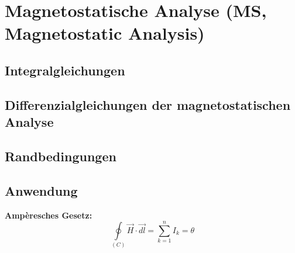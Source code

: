 \section{Magnetostatische Analyse (MS, Magnetostatic Analysis)}
\subsection{Integralgleichungen}
\subsection{Differenzialgleichungen der magnetostatischen Analyse}
\subsection{Randbedingungen}
\subsection{Anwendung}
\textbf{Ampèresches Gesetz:} \\
\[ \oint\limits_{(C)}\vec{H}\cdot\vec{dl} = \sum\limits_{k = 1}^{n} I_k = \theta \]
\clearpage
\pagebreak
